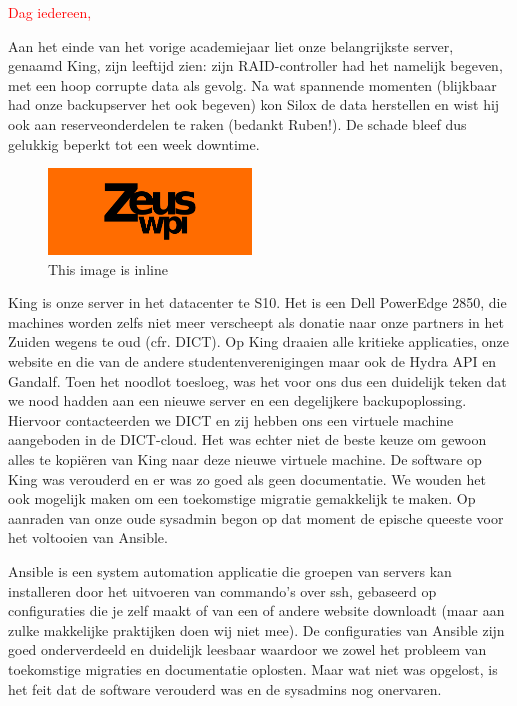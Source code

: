 \documentclass{article}
\begin{document}
\textcolor{red}{Dag iedereen,}

{\color{blue}
Aan het einde van het vorige academiejaar liet onze belangrijkste server, genaamd King, zijn leeftijd zien: zijn RAID-controller had het namelijk begeven, met een hoop corrupte data als gevolg.
Na wat spannende momenten (blijkbaar had onze backupserver het ook begeven) kon Silox de data herstellen en wist hij ook aan reserveonderdelen te raken (bedankt Ruben!).
De schade bleef dus gelukkig beperkt tot een week downtime.
}

\begin{figure}
  \begin{center}
    \includegraphics[width=0.48\textwidth]{image1.png}
  \end{center}
  \caption{This image is inline}
\end{figure}
King is onze server in het datacenter te S10.
Het is een Dell PowerEdge 2850, die machines worden zelfs niet meer verscheept als donatie naar onze partners in het Zuiden wegens te oud (cfr. DICT).
Op King draaien alle kritieke applicaties, onze website en die van de andere studentenverenigingen maar ook de Hydra API en Gandalf. Toen het noodlot toesloeg, was het voor ons dus een duidelijk teken dat we nood hadden aan een nieuwe server en een degelijkere backupoplossing.
Hiervoor contacteerden we DICT en zij hebben ons een virtuele machine aangeboden in de DICT-cloud.
Het was echter niet de beste keuze om gewoon alles te kopiëren van King naar deze nieuwe virtuele machine.
De software op King was verouderd en er was zo goed als geen documentatie.
We wouden het ook mogelijk maken om een toekomstige migratie gemakkelijk te maken.
Op aanraden van onze oude sysadmin begon op dat moment de epische queeste voor het voltooien van Ansible.

Ansible is een system automation applicatie die groepen van servers kan installeren door het uitvoeren van commando’s over ssh, gebaseerd op configuraties die je zelf maakt of van een of andere website downloadt (maar aan zulke makkelijke praktijken doen wij niet mee).
De configuraties van Ansible zijn goed onderverdeeld en duidelijk leesbaar waardoor we zowel het probleem van toekomstige migraties en documentatie oplosten. Maar wat niet was opgelost, is het feit dat de software verouderd was en de sysadmins nog onervaren.
\end{document}
